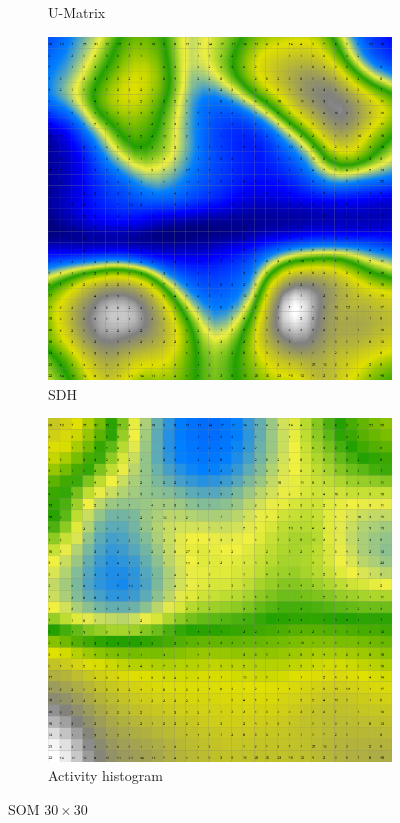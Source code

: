 \documentclass{acm_proc_article-sp}
\begin{document}
\begin{figure}
\begin{subfigure}[b]{0.45\linewidth}
    \caption{U-Matrix}
    \label{fig:wine-big-u-matrix}
\end{subfigure}
\begin{subfigure}[b]{0.45\linewidth}
    \includegraphics[width=\linewidth]{img/wine-big-smoothed-data-histogram}
    \caption{SDH}
    \label{fig:wine-big-smoothed-data-histogram}
\end{subfigure}
\begin{subfigure}[b]{0.45\linewidth}
    \includegraphics[width=\linewidth]{img/wine-big-activity-histogram}
    \caption{Activity histogram}
    \label{fig:wine-big-activity-histogram}
\end{subfigure}
\caption{SOM $30\times30$}
\end{figure}
\end{document}
